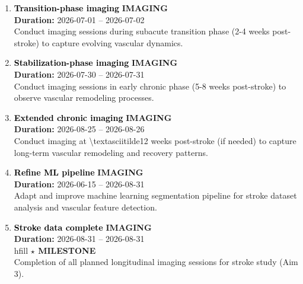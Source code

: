 \documentclass[a4paper]{article}
\newcommand{\cellcolor}[2]{\colorbox{#1}{#2}}
\begin{document}
\begin{enumerate}[leftmargin=0.3cm, itemsep=0.3em, parsep=0.1em, topsep=0.1em]
    \item \textcolor{black}{\textbf{\Large Transition-phase imaging}}
          \hfill \cellcolor{black!15}{\textbf{\small IMAGING}}
          \\ \textcolor{black!60}{\textbf{Duration:} 2026-07-01 -- 2026-07-02} \\ \textcolor{black!80}{\small Conduct imaging sessions during subacute transition phase (2-4 weeks post-stroke) to capture evolving vascular dynamics.}

    \item \textcolor{black}{\textbf{\Large Stabilization-phase imaging}}
          \hfill \cellcolor{black!15}{\textbf{\small IMAGING}}
          \\ \textcolor{black!60}{\textbf{Duration:} 2026-07-30 -- 2026-07-31} \\ \textcolor{black!80}{\small Conduct imaging sessions in early chronic phase (5-8 weeks post-stroke) to observe vascular remodeling processes.}

    \item \textcolor{black}{\textbf{\Large Extended chronic imaging}}
          \hfill \cellcolor{black!15}{\textbf{\small IMAGING}}
          \\ \textcolor{black!60}{\textbf{Duration:} 2026-08-25 -- 2026-08-26} \\ \textcolor{black!80}{\small Conduct imaging at \textbackslash{}textasciitilde{}12 weeks post-stroke (if needed) to capture long-term vascular remodeling and recovery patterns.}

    \item \textcolor{black}{\textbf{\Large Refine ML pipeline}}
          \hfill \cellcolor{black!15}{\textbf{\small IMAGING}}
          \\ \textcolor{black!60}{\textbf{Duration:} 2026-06-15 -- 2026-08-31} \\ \textcolor{black!80}{\small Adapt and improve machine learning segmentation pipeline for stroke dataset analysis and vascular feature detection.}

    \item \textcolor{black}{\textbf{\Large Stroke data complete}}
          \hfill \cellcolor{black!15}{\textbf{\small IMAGING}}
          \\ \textcolor{black!60}{\textbf{Duration:} 2026-08-31 -- 2026-08-31} \\hfill \textcolor{milestone}{\textbf{$\star$ MILESTONE}} \\ \textcolor{black!80}{\small Completion of all planned longitudinal imaging sessions for stroke study (Aim 3).}


\end{enumerate}
\end{document}
